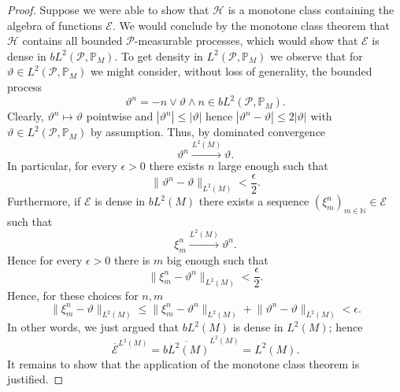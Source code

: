 \documentclass[11pt,a4paper,twoside,openany]{report}
\numberwithin{equation}{section}
\theoremstyle{plain} %
\theoremstyle{definition} %
\theoremstyle{remark} %
\begin{document}
\begin{proof}
    
      Suppose we were able to show that \(\mathcal{H}\) is a monotone class containing the algebra of functions \(\mathcal{E}\). We would conclude by the monotone class theorem  that \(\mathcal{H}\) contains all bounded \(\mathcal{P}\)-measurable processes, which would show that \(\mathcal{E}\) is dense in \(bL^2(\mathcal{P},\mathbb{P}_M)\). To get density in \(L^2(\mathcal{P},\mathbb{P}_M)\) we observe that for \(\vartheta\in L^2(\mathcal{P},\mathbb{P}_M)\) we might consider, without loss of generality, the bounded process
    \begin{equation*}
        \vartheta^n=-n\vee \vartheta\wedge n\in bL^2(\mathcal{P},\mathbb{P}_M).
    \end{equation*}
 Clearly, \(\vartheta^n\mapsto \vartheta\) pointwise and \(|\vartheta^n|\leq|\vartheta|\) hence \(|\vartheta^n-\vartheta|\leq 2|\vartheta|\) with \(\vartheta\in L^2(\mathcal{P},\mathbb{P}_M)\) by assumption. Thus, by dominated convergence
    \begin{equation*}
        \vartheta^n\overset{L^2(M)}{\to}\vartheta.
    \end{equation*}
    In particular, for every \(\epsilon>0\) there exists \(n\) large enough such that
    \begin{equation*}
        \lVert \vartheta^n-\vartheta\rVert_{L^2(M)}<\frac{\epsilon}{2}.
    \end{equation*}
    Furthermore, if \(\mathcal{E}\) is dense in \(bL^2(M)\) there exists a sequence \((\xi^n_m)_{m\in\mathbb{N}}\in\mathcal{E}\) such that 
    \begin{equation*}
         \xi^n_m\overset{L^2(M)}{\to}\vartheta^n.
    \end{equation*}
    Hence for every \(\epsilon>0\) there is \(m\) big enough such that
    \begin{equation*}
        \lVert \xi^n_m-\vartheta^n\rVert_{L^2(M)}<\frac{\epsilon}{2}.
    \end{equation*}
    Hence, for these choices for \(n,m\)
    \begin{equation*}
        \lVert \xi^n_m-\vartheta\rVert_{L^2(M)}\leq\lVert \xi^n_m-\vartheta^n\rVert_{L^2(M)}+\lVert \vartheta^n-\vartheta\rVert_{L^2(M)}<\epsilon.
    \end{equation*}
    In other words, we just argued that \(bL^2(M)\) is dense in \(L^2(M)\); hence
    \begin{equation*}
        \overline{\mathcal{E}}^{L^2(M)}=\overline{bL^2(M)}^{L^2(M)}=L^2(M).
    \end{equation*}
 It remains to show that the application of the monotone class theorem is justified. 


\end{proof}
\end{document}

